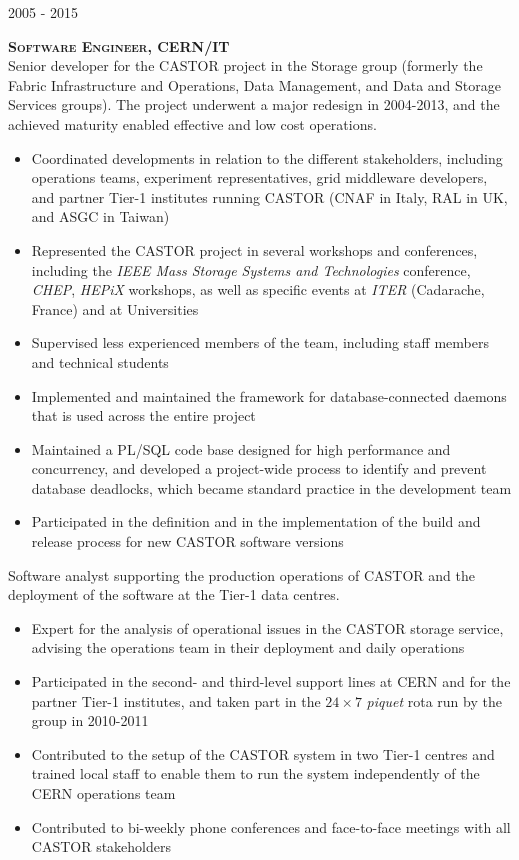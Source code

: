 \documentclass[11pt]{article}
\renewcommand{\subsection}[2]%
        {
         {\bf{\raggedright \scshape #1}}{\bf{\hfill \scshape #2}}\\[-.7\baselineskip]
}
\newenvironment{CompactItemize} {
  \begin{itemize}
  \setlength{\itemsep}{-3pt}
  \setlength{\parsep}{0pt}
  \setlength{\topsep}{-2pt}
  \setlength{\partopsep}{-2pt}
} {\end{itemize}}
\begin{document}
\subsection{2005 - 2015}{Software Engineer, CERN/IT}

Senior developer for the CASTOR project in the Storage group (formerly the Fabric Infrastructure and Operations, Data Management, and Data and Storage Services groups).
The project underwent a major redesign in 2004-2013, and the achieved maturity enabled effective and low cost operations.

\begin{CompactItemize}
\item Coordinated developments in relation to the different stakeholders, including
  operations teams, experiment representatives, grid middleware developers, and partner Tier-1
  institutes running CASTOR (CNAF in Italy, RAL in UK, and ASGC in Taiwan)
\item Represented the CASTOR project in several workshops and conferences, including the
\emph{IEEE Mass Storage Systems and Technologies} conference, \emph{CHEP}, \emph{HEPiX} workshops, as well as specific events at \emph{ITER} (Cadarache, France) and at Universities
\item Supervised less experienced members of the team, including staff members and technical students
\item Implemented and maintained the framework for database-connected daemons that is used
  across the entire project
\item Maintained a PL/SQL code base designed for high performance and concurrency, and developed a
  project-wide process to identify and prevent database deadlocks, which became standard practice in the development team
\item Participated in the definition and in the implementation of the build and release process
  for new CASTOR software versions
\end{CompactItemize}

Software analyst supporting the production operations of CASTOR and the
deployment of the software at the Tier-1 data centres.

\begin{CompactItemize}
\item Expert for the analysis of operational issues in the CASTOR storage service, advising
  the operations team in their deployment and daily operations
\item Participated in the second- and third-level support lines at CERN and for the partner Tier-1
  institutes, and taken part in the $24\times7$ \emph{piquet} rota run by the group in 2010-2011
\item Contributed to the setup of the CASTOR system in two Tier-1 centres and trained local
  staff to enable them to run the system independently of the CERN operations team
\item Contributed to bi-weekly phone conferences and face-to-face meetings with all CASTOR stakeholders
\end{CompactItemize}
\end{document}
